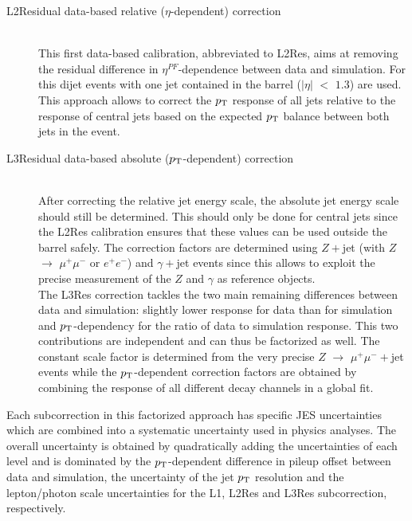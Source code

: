 \begin{myindentpar}
\begin{description}
    \item[L2Residual data-based relative ($\eta$-dependent) correction] \hfill \\
    This first data-based calibration, abbreviated to L2Res, aims at removing the residual difference in $\eta^{PF}$-dependence between data and simulation. For this dijet events with one jet contained in the barrel ($\vert \eta \vert$ $<$ $1.3$) are used. This approach allows to correct the $p_{\rm T}$ response of all jets relative to the response of central jets based on the expected $p_{\rm T}$ balance between both jets in the event.
        
    \item[L3Residual data-based absolute ($p_{\rm T}$-dependent) correction] \hfill \\
    After correcting the relative jet energy scale, the absolute jet energy scale should still be determined. This should only be done for central jets since the L2Res calibration ensures that these values can be used outside the barrel safely. 
    The correction factors are determined using $Z+$jet (with $Z$ $\rightarrow$ $\mu^{+}\mu^{-}$ or $e^{+}e^{-}$) and $\gamma+$jet events since this allows to exploit the precise measurement of the $Z$ and $\gamma$ as reference objects.
    \\
    The L3Res correction tackles the two main remaining differences between data and simulation: slightly lower response for data than for simulation and $p_{\rm T}$-dependency for the ratio of data to simulation response. This two contributions are independent and can thus be factorized as well. The constant scale factor is determined from the very precise $Z$ $\rightarrow$ $\mu^{+} \mu^{-}+$jet events while the $p_{\rm T}$-dependent correction factors are obtained by combining the response of all different decay channels in a global fit.

  \end{description}
\end{myindentpar}

Each subcorrection in this factorized approach has specific JES uncertainties which are combined into a systematic uncertainty used in physics analyses. The overall uncertainty is obtained by quadratically adding the uncertainties of each level and is dominated by the $p_{\rm T}$-dependent difference in pileup offset between data and simulation, the uncertainty of the jet $p_{\rm T}$ resolution and the lepton/photon scale uncertainties for the L1, L2Res and L3Res subcorrection, respectively.

